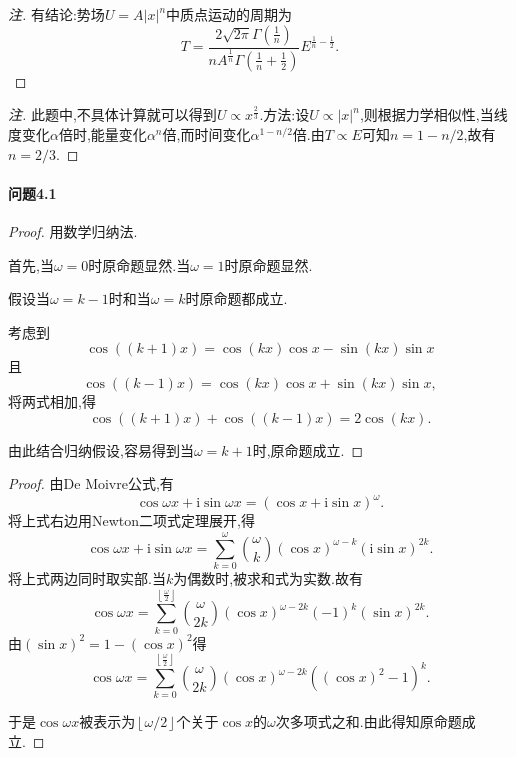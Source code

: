 \documentclass{article}
\newenvironment{annotation}{\renewcommand\qedsymbol{}\begin{proof}[注]}{\end{proof}}
\newcommand{\nstars}[1]{\multido{}{#1}{$\star$}}
\begin{document}
\begin{annotation}

有结论:势场$U=A\left|x\right|^n$中质点运动的周期为
$$T=\frac{2\sqrt{2\pi}\Gamma\left(\frac1n\right)}{nA^{\frac1n}\Gamma\left(\frac1n+\frac12\right)}E^{\frac1n-\frac12}.$$

\end{annotation}

\begin{annotation}

此题中,不具体计算就可以得到$U\propto x^\frac23$.方法:设$U\propto\left|x\right|^n$,则根据力学相似性,当线度变化$\alpha$倍时,能量变化$\alpha^n$倍,而时间变化$\alpha^{1-n/2}$倍.由$T\propto E$可知$n=1-n/2$,故有$n=2/3$.

\end{annotation}

\paragraph{问题4.1}\nstars{3}

\begin{proof}

用数学归纳法.

首先,当$\omega=0$时原命题显然.当$\omega=1$时原命题显然.

假设当$\omega=k-1$时和当$\omega=k$时原命题都成立.

考虑到
$$\cos\left(\left(k+1\right)x\right)=\cos\left(kx\right)\cos x-\sin\left(kx\right)\sin x$$
且
$$\cos\left(\left(k-1\right)x\right)=\cos\left(kx\right)\cos x+\sin\left(kx\right)\sin x,$$
将两式相加,得
$$\cos\left(\left(k+1\right)x\right)+\cos\left(\left(k-1\right)x\right)=2\cos\left(kx\right).$$

由此结合归纳假设,容易得到当$\omega=k+1$时,原命题成立.

\end{proof}

\begin{proof}

由De Moivre公式,有
$$\cos\omega x+\mathrm i\sin\omega x=\left(\cos x+\mathrm i\sin x\right)^\omega.$$
将上式右边用Newton二项式定理展开,得
$$\cos\omega x+\mathrm i\sin\omega x=\sum_{k=0}^\omega\binom\omega k\left(\cos x\right)^{\omega-k}\left(\mathrm i\sin x\right)^{2k}.$$
将上式两边同时取实部.当$k$为偶数时,被求和式为实数.故有
$$\cos\omega x=\sum_{k=0}^{\left\lfloor\frac\omega2\right\rfloor}\binom\omega{2k}\left(\cos x\right)^{\omega-2k}\left(-1\right)^k\left(\sin x\right)^{2k}.$$
由$\left(\sin x\right)^2=1-\left(\cos x\right)^2$得
$$\cos\omega x=\sum_{k=0}^{\left\lfloor\frac\omega2\right\rfloor}\binom\omega{2k}\left(\cos x\right)^{\omega-2k}\left(\left(\cos x\right)^2-1\right)^k.$$

于是$\cos\omega x$被表示为$\left\lfloor\omega/2\right\rfloor$个关于$\cos x$的$\omega$次多项式之和.由此得知原命题成立.

\end{proof}
\end{document}
